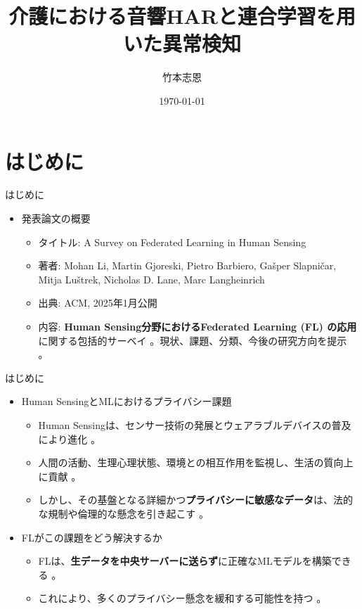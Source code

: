 \documentclass[unicode,12pt,aspectratio=169,dvipdfmx]{beamer}
\title{介護における音響HARと連合学習を用いた異常検知}
\author{竹本志恩}
\institute{INIAD}
\date{\today}
\begin{document}
\begin{frame}
    \titlepage
\end{frame}

\section{はじめに}
\begin{frame}{はじめに}
    \begin{itemize}
        \item 発表論文の概要
        \begin{itemize}
            \item タイトル: A Survey on Federated Learning in Human Sensing \cite{Source52, Source53}
            \item 著者: Mohan Li, Martin Gjoreski, Pietro Barbiero, Gašper Slapničar, Mitja Luštrek, Nicholas D. Lane, Marc Langheinrich \cite{Source52}
            \item 出典: ACM, 2025年1月公開 \cite{Source53, Source54}
            \item 内容: \textbf{Human Sensing分野におけるFederated Learning (FL) の応用}に関する包括的サーベイ \cite{Source52, Source53}。現状、課題、分類、今後の研究方向を提示 \cite{Source52, Source53}。
        \end{itemize}
    \end{itemize}
\end{frame}


\begin{frame}{はじめに}
    \begin{itemize}
        \item Human SensingとMLにおけるプライバシー課題
        \begin{itemize}
            \item Human Sensingは、センサー技術の発展とウェアラブルデバイスの普及により進化 \cite{Source54}。
            \item 人間の活動、生理心理状態、環境との相互作用を監視し、生活の質向上に貢献 \cite{Source52, Source54}。
            \item しかし、その基盤となる詳細かつ\textbf{プライバシーに敏感なデータ}は、法的な規制や倫理的な懸念を引き起こす \cite{Source52, Source55}。
        \end{itemize}
        \item FLがこの課題をどう解決するか
        \begin{itemize}
            \item FLは、\textbf{生データを中央サーバーに送らず}に正確なMLモデルを構築できる \cite{Source55}。
            \item これにより、多くのプライバシー懸念を緩和する可能性を持つ \cite{Source52, Source55}。
        \end{itemize}
    \end{itemize}
\end{frame}
\end{document}
